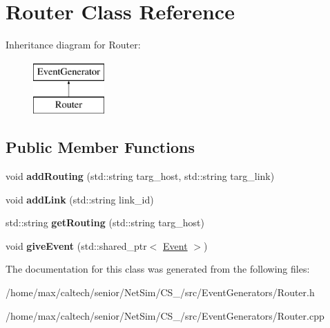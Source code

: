 \hypertarget{classRouter}{\section{\-Router \-Class \-Reference}
\label{classRouter}
}
\-Inheritance diagram for \-Router\-:\begin{figure}[H]
\begin{center}
\leavevmode
\includegraphics[height=2.000000cm]{classRouter}
\end{center}
\end{figure}
\subsection*{\-Public \-Member \-Functions}
\begin{DoxyCompactItemize}
\item 
\hypertarget{classRouter_a0c8e76247f99d1ece5ab8368f30bcb9e}{void {\bfseries add\-Routing} (std\-::string targ\-\_\-host, std\-::string targ\-\_\-link)}\label{classRouter_a0c8e76247f99d1ece5ab8368f30bcb9e}

\item 
\hypertarget{classRouter_a07a2d8e8d3f8f2ce68178afa61bfe00c}{void {\bfseries add\-Link} (std\-::string link\-\_\-id)}\label{classRouter_a07a2d8e8d3f8f2ce68178afa61bfe00c}

\item 
\hypertarget{classRouter_a2c333b431ae61349b91277cda82a3f5e}{std\-::string {\bfseries get\-Routing} (std\-::string targ\-\_\-host)}\label{classRouter_a2c333b431ae61349b91277cda82a3f5e}

\item 
\hypertarget{classRouter_aed4bdd88f4fa09cb784c5c329c935688}{void {\bfseries give\-Event} (std\-::shared\-\_\-ptr$<$ \hyperlink{classEvent}{\-Event} $>$)}\label{classRouter_aed4bdd88f4fa09cb784c5c329c935688}

\end{DoxyCompactItemize}


\-The documentation for this class was generated from the following files\-:\begin{DoxyCompactItemize}
\item 
/home/max/caltech/senior/\-Net\-Sim/\-C\-S\-\_/src/\-Event\-Generators/\-Router.\-h\item 
/home/max/caltech/senior/\-Net\-Sim/\-C\-S\-\_/src/\-Event\-Generators/\-Router.\-cpp\end{DoxyCompactItemize}
